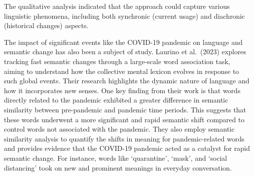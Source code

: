 The qualitative analysis indicated that the approach could capture various linguistic phenomena, including both synchronic (current usage) and diachronic (historical changes) aspects.

The impact of significant events like the COVID-19 pandemic on language and semantic change has also been a subject of study.
Laurino et al.\ (2023) explores tracking fast semantic changes through a large-scale word association task, aiming to understand how the collective mental lexicon evolves in response to such global events.
Their research highlights the dynamic nature of language and how it incorporates new senses.
One key finding from their work is that words directly related to the pandemic exhibited a greater difference in semantic similarity between pre-pandemic and pandemic time periods.
This suggests that these words underwent a more significant and rapid semantic shift compared to control words not associated with the pandemic.
They also employ semantic similarity analysis to quantify the shifts in meaning for pandemic-related words and provides evidence that the COVID-19 pandemic acted as a catalyst for rapid semantic change.
For instance, words like `quarantine', `mask', and `social distancing' took on new and prominent meanings in everyday conversation.

